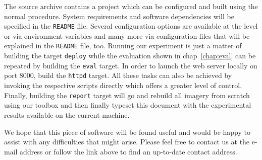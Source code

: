 \documentclass{graphstudy}
\begin{document}
The source archive contains a \CMake{} project which can be configured and built using the normal procedure.  System
requirements and software dependencies will be specified in the \verb`README` file.  Several configuration options are
available at the {\CMake} level or via environment variables and many more via configuration files that will be
explained in the \verb`README` file, too.  Running our experiment is just a matter of building the target \verb`deploy`
while the evaluation shown in \acl{chap}~\ref{chap:eval} can be repeated by building the \verb`eval` target.  In order
to launch the web server locally on port \(8000\), build the \verb`httpd` target.  All these tasks can also be achieved
by invoking the respective scripts directly which offers a greater level of control.  Finally, building the
\verb`report` target will go and rebuild all imagery from scratch using our toolbox and then finally typeset this
document with the experimental results available on the current machine.

We hope that this piece of software will be found useful and would be happy to assist with any difficulties that might
arise.  Please feel free to contact us at the e-mail address  or follow the link
above to find an up-to-date contact address.
\end{document}

